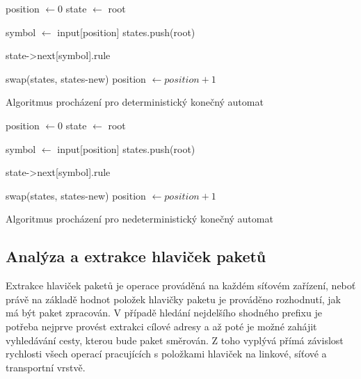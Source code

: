\begin{algorithm}
    position $\leftarrow 0$
    state $\leftarrow$ root
    {
        symbol $\leftarrow$ input[position]\;
        states.push(root)\;

        {
             {\Return state->next[symbol].rule}
        }

        swap(states, states-new)\;
        position $\leftarrow position + 1$\;
    }
    \caption{Algoritmus procházení pro deterministický konečný automat}
    \label{alg:dfa}
\end{algorithm}

\begin{algorithm}
    position $\leftarrow 0$
    state $\leftarrow$ root
    {
        symbol $\leftarrow$ input[position]\;
        states.push(root)\;

        {
             {\Return state->next[symbol].rule}
        }

        swap(states, states-new)\;
        position $\leftarrow position + 1$\;
    }
    \caption{Algoritmus procházení pro nedeterministický konečný automat}
    \label{alg:nfa}
\end{algorithm}

\subsection{Analýza a extrakce hlaviček paketů} %

Extrakce hlaviček paketů je operace prováděná na každém síťovém zařízení,
neboť právě na základě hodnot položek hlavičky paketu je prováděno rozhodnutí,
jak má být paket zpracován.
V případě hledání nejdelšího shodného prefixu je potřeba nejprve provést extrakci
cílové adresy a až poté je možné zahájit vyhledávání cesty, kterou bude paket směrován.
Z toho vyplývá přímá závislost rychlosti všech operací pracujících s položkami hlaviček na linkové, síťové a
transportní vrstvě.

